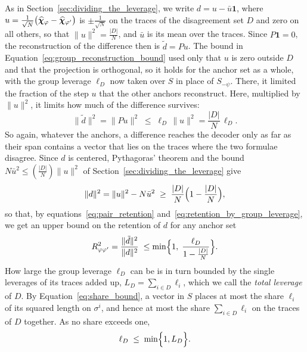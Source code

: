 \documentclass[titlepage,a4paper,11pt]{report}
\begin{document}
    As in Section~\ref{sec:dividing_the_leverage}, we write $d=u-\bar u\mathbf{1}$, where $u=\frac{1}{\sqrt N}\bigl(\satvec_\phi-\satvec_{\phi'}\bigr)$ is $\pm\frac{1}{\sqrt N}$ on the traces of the disagreement set $D$ and zero on all others, so that $\lVert u\rVert^2=\frac{|D|}{N}$, and $\bar u$ is its mean over the traces. Since $P\mathbf{1}=0$, the reconstruction of the difference then is $\tilde d=Pu$. The bound in Equation~\eqref{eq:group_reconstruction_bound} used only that $u$ is zero outside $D$ and that the projection is orthogonal, so it holds for the anchor set as a whole, with the group leverage $\ell_D$ now taken over $S$ in place of $S_{-\psi}$. There, it limited the fraction of the step $u$ that the other anchors reconstruct. Here, multiplied by $\lVert u\rVert^2$, it limits how much of the difference survives:
    \begin{equation}\label{eq:retention_by_group_leverage}
        \lVert\tilde d\rVert^2=\lVert Pu\rVert^2\;\le\;\ell_D\,\lVert u\rVert^2=\frac{|D|}{N}\,\ell_D .
    \end{equation}
    So again, whatever the anchors, a difference reaches the decoder only as far as their span contains a vector that lies on the traces where the two formulae disagree. Since $d$ is centered, Pythagoras' theorem and the bound $N\bar u^2\le(\frac{|D|}{N})\lVert u\rVert^2$ of Section~\ref{sec:dividing_the_leverage} give
    \begin{equation}
        \lVert d\rVert^2=\lVert u\rVert^2-N\bar u^2\;\ge\;\frac{|D|}{N}\Bigl(1-\frac{|D|}{N}\Bigr),
    \end{equation}
    so that, by equations~\eqref{eq:pair_retention} and~\eqref{eq:retention_by_group_leverage}, we get an upper bound on the retention of $d$ for any anchor set
    \begin{equation}\label{eq:retention_ceiling}
        R^2_{\phi\phi'}=\frac{\lVert \tilde d\rVert^2}{\lVert d\rVert^2}\;\le\min\Bigl\{1,\;\frac{\ell_D}{1-\frac{|D|}{N}}\Bigr\}.
    \end{equation}
    How large the group leverage $\ell_D$ can be is in turn bounded by the single leverages of its traces added up, $L_D = \sum_{i\in D}\ell_i$, which we call the \emph{total leverage} of $D$. By Equation~\eqref{eq:share_bound}, a vector in $S$ places at most the share $\ell_i$ of its squared length on $\sigma^i$, and hence at most the share $\sum_{i\in D}\ell_i$ on the traces of $D$ together. As no share exceeds one,
    \begin{equation}\label{eq:group_leverage_ceiling}
        \ell_D\;\le\;\min\Bigl\{1,L_D\Bigr\}.
    \end{equation}
\end{document}
